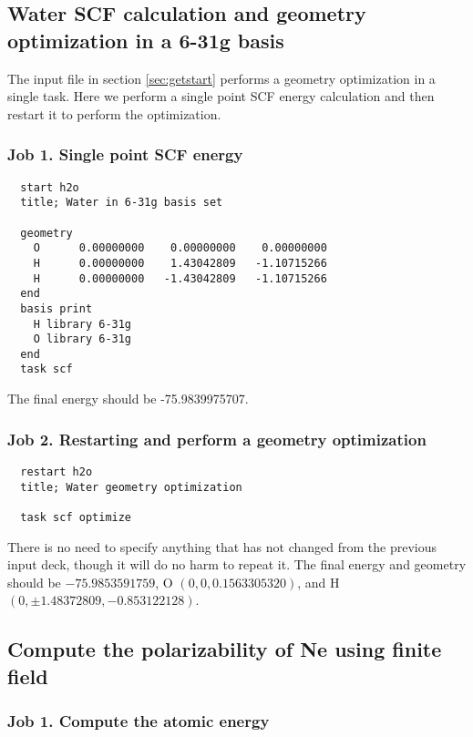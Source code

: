 \label{sec:sample}
\subsection{Water SCF calculation and geometry optimization in a 6-31g basis}

The input file in section \ref{sec:getstart} performs a geometry optimization
in a single task.  Here we perform a single point SCF energy calculation and then
restart it to perform the optimization.

\subsubsection{Job 1.  Single point SCF energy}

\begin{verbatim}
  start h2o
  title; Water in 6-31g basis set

  geometry
    O      0.00000000    0.00000000    0.00000000
    H      0.00000000    1.43042809   -1.10715266
    H      0.00000000   -1.43042809   -1.10715266
  end
  basis print
    H library 6-31g
    O library 6-31g
  end
  task scf
\end{verbatim}

The final energy should be -75.9839975707.

\subsubsection{Job 2. Restarting and perform a geometry optimization}

\begin{verbatim}
  restart h2o
  title; Water geometry optimization

  task scf optimize
\end{verbatim}

There is no need to specify anything that has not changed from the
previous input deck, though it will do no harm to repeat it.  The
final energy and geometry should be $-75.9853591759$, O
$(0,0,0.1563305320)$, and H $(0, \pm1.48372809, -0.853122128)$.

\subsection{Compute the polarizability of Ne using finite field}

\subsubsection{Job 1. Compute the atomic energy}

